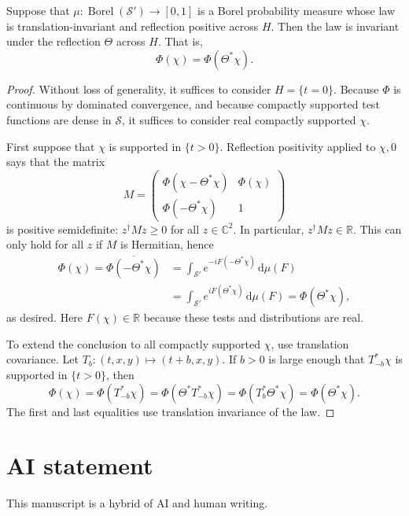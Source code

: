 \documentclass[11pt, letterpaper, reqno]{amsart}
\theoremstyle{definition}
\newenvironment{proposition}
{\pushQED{\qed}\renewcommand{\qedsymbol}{$\blacksquare$}\propositionx}
{\popQED\endpropositionx}
\theoremstyle{remark}
\newcommand{\bbC}{\mathbb{C}}
\newcommand{\bbR}{\mathbb{R}}
\newcommand{\calS}{\mathcal{S}}
\newcommand{\dd}{\,\mathrm{d}}
\begin{document}
\begin{proposition}\label{prop:refl}
Suppose that $\mu:\operatorname{Borel}(\calS')\to[0,1]$ is a Borel
probability measure whose law is translation-invariant and reflection
positive across $H$. Then the law is invariant under the reflection
$\Theta$ across $H$. That is,
\begin{equation}
 \Phi(\chi)=\Phi(\Theta^*\chi).
\end{equation}
\end{proposition}
\begin{proof}
Without loss of generality, it suffices to consider $H=\{t=0\}$.
Because $\Phi$ is continuous by dominated convergence, and because
compactly supported test functions are dense in $\calS$, it suffices
to consider real compactly supported $\chi$.

First suppose that $\chi$ is supported in $\{t>0\}$. Reflection
positivity applied to $\chi,0$ says that the matrix
\begin{equation}
 M=\begin{pmatrix}
 \Phi(\chi-\Theta^*\chi)&\Phi(\chi)\\
 \Phi(-\Theta^*\chi)&1
 \end{pmatrix}
\end{equation}
is positive semidefinite: $z^\dagger Mz\geq0$ for all $z\in\bbC^2$.
In particular, $z^\dagger Mz\in\bbR$. This can only hold for all $z$
if $M$ is Hermitian, hence
\begin{align*}
 \Phi(\chi)=\overline{\Phi(-\Theta^*\chi)}
 &=\int_{\calS'}e^{-iF(-\Theta^*\chi)}\dd\mu(F)\\
 &=\int_{\calS'}e^{iF(\Theta^*\chi)}\dd\mu(F)
 =\Phi(\Theta^*\chi),
\end{align*}
as desired. Here $F(\chi)\in\bbR$ because these tests and
distributions are real.

To extend the conclusion to all compactly supported $\chi$, use
translation covariance. Let $T_b:(t,x,y)\mapsto(t+b,x,y)$. If $b>0$
is large enough that $T_{-b}^*\chi$ is supported in $\{t>0\}$, then
\begin{equation}
 \Phi(\chi)=\Phi(T_{-b}^*\chi)
 =\Phi(\Theta^*T_{-b}^*\chi)
 =\Phi(T_b^*\Theta^*\chi)=\Phi(\Theta^*\chi).
\end{equation}
The first and last equalities use translation invariance of the law.
\end{proof}

\section*{AI statement}

This manuscript is a hybrid of AI and human writing.

\printbibliography
\end{document}
